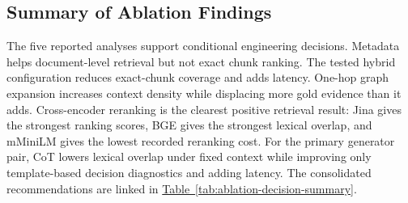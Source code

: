 \begin{table}[!t]
\vspace{0.20em}
\caption{Decision summary for the completed ablation families. Quality claims
are limited to the deterministic metrics available in the saved artifacts.}
\label{tab:ablation-decision-summary}
\end{table}

\subsection{Summary of Ablation Findings}
\label{sec:ablation-summary}

The five reported analyses support conditional engineering decisions. Metadata
helps document-level retrieval but not exact chunk ranking. The tested hybrid
configuration reduces exact-chunk coverage and adds latency. One-hop graph
expansion increases context density while displacing more gold evidence than
it adds. Cross-encoder reranking is the clearest positive retrieval result:
Jina gives the strongest ranking scores, BGE gives the strongest lexical
overlap, and mMiniLM gives the lowest recorded reranking cost. For the primary
generator pair, CoT lowers lexical overlap under fixed context while improving
only template-based decision diagnostics and adding latency. The consolidated
recommendations are linked in
\hyperref[tab:ablation-decision-summary]{Table~\ref*{tab:ablation-decision-summary}}.
